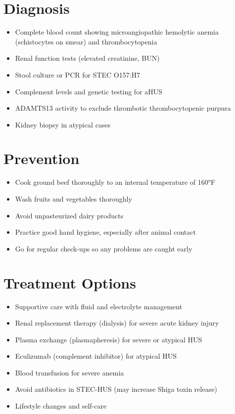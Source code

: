 \section{Diagnosis}

\begin{itemize}[noitemsep]
  \item Complete blood count showing microangiopathic hemolytic anemia (schistocytes on smear) and thrombocytopenia
  \item Renal function tests (elevated creatinine, BUN)
  \item Stool culture or PCR for STEC O157:H7
  \item Complement levels and genetic testing for aHUS
  \item ADAMTS13 activity to exclude thrombotic thrombocytopenic purpura
  \item Kidney biopsy in atypical cases
\end{itemize}

\section{Prevention}

\begin{itemize}[noitemsep]
  \item Cook ground beef thoroughly to an internal temperature of 160°F
  \item Wash fruits and vegetables thoroughly
  \item Avoid unpasteurized dairy products
  \item Practice good hand hygiene, especially after animal contact
  \item Go for regular check-ups so any problems are caught early
\end{itemize}

\section{Treatment Options}

\begin{itemize}[noitemsep]
  \item Supportive care with fluid and electrolyte management
  \item Renal replacement therapy (dialysis) for severe acute kidney injury
  \item Plasma exchange (plasmapheresis) for severe or atypical HUS
  \item Eculizumab (complement inhibitor) for atypical HUS
  \item Blood transfusion for severe anemia
  \item Avoid antibiotics in STEC-HUS (may increase Shiga toxin release)
  \item Lifestyle changes and self-care
\end{itemize}

